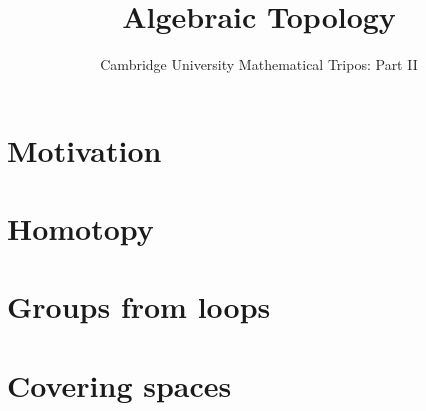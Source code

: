 \documentclass{article}
\title{Algebraic Topology}
\author{Cambridge University Mathematical Tripos: Part II}
\begin{document}
\maketitle

\tableofcontentsnewpage{}

\section{Motivation}

\section{Homotopy}

\section{Groups from loops}

\section{Covering spaces}

\end{document}
